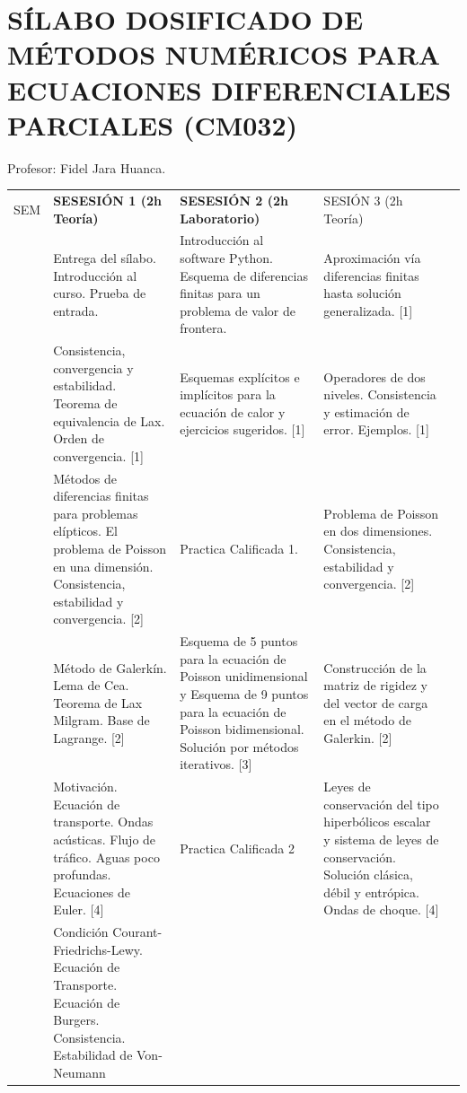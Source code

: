 \documentclass[
]{article}
\author{}
\date{}
\begin{document}
\section{}\label{section}

\section{SÍLABO DOSIFICADO DE MÉTODOS NUMÉRICOS PARA ECUACIONES
DIFERENCIALES PARCIALES
(CM032)}\label{suxedlabo-dosificado-de-muxe9todos-numuxe9ricos-para-ecuaciones-diferenciales-parciales-cm032}

Profesor: Fidel Jara Huanca.

\begin{longtable}[]{@{}
  >{\raggedright\arraybackslash}p{}
  >{\raggedright\arraybackslash}p{}
  >{\raggedright\arraybackslash}p{}
  >{\raggedright\arraybackslash}p{}
  >{\raggedright\arraybackslash}p{}@{}}
\toprule\noalign{}
& & & & \\
\midrule\noalign{}
\endhead
\bottomrule\noalign{}
\endlastfoot
SEM & \textbf{SESESIÓN 1 (2h Teoría)} & \textbf{SESESIÓN 2 (2h
Laboratorio)} & SESIÓN 3 (2h Teoría) & \\
1\textbf{} & Entrega del sílabo. Introducción al curso. Prueba de
entrada. & Introducción al software Python. Esquema de diferencias
finitas para un problema de valor de frontera. & Aproximación vía
diferencias finitas hasta solución generalizada. {[}1{]} & \\
2 & Consistencia, convergencia y estabilidad. Teorema de equivalencia de
Lax. Orden de convergencia. {[}1{]} & Esquemas explícitos e implícitos
para la ecuación de calor y ejercicios sugeridos. {[}1{]} & Operadores
de dos niveles. Consistencia y estimación de error. Ejemplos. {[}1{]}
& \\
3 & Métodos de diferencias finitas para problemas elípticos. El problema
de Poisson en una dimensión. Consistencia, estabilidad y convergencia.
{[}2{]} & Practica Calificada 1. & Problema de Poisson en dos
dimensiones. Consistencia, estabilidad y convergencia. {[}2{]} & \\
4 & Método de Galerkín. Lema de Cea. Teorema de Lax Milgram. Base de
Lagrange. {[}2{]} & Esquema de 5 puntos para la ecuación de Poisson
unidimensional y Esquema de 9 puntos para la ecuación de Poisson
bidimensional. Solución por métodos iterativos. {[}3{]} & Construcción
de la matriz de rigidez y del vector de carga en el método de Galerkin.
{[}2{]} & \\
5\textbf{} & Motivación. Ecuación de transporte. Ondas acústicas. Flujo
de tráfico. Aguas poco profundas. Ecuaciones de Euler. {[}4{]} &
Practica Calificada 2 & Leyes de conservación del tipo hiperbólicos
escalar y sistema de leyes de conservación. Solución clásica, débil y
entrópica. Ondas de choque. {[}4{]} & \\
6 & Condición Courant-Friedrichs-Lewy. Ecuación de Transporte. Ecuación
de Burgers. Consistencia. Estabilidad de Von-Neumann


\end{longtable}
\end{document}
